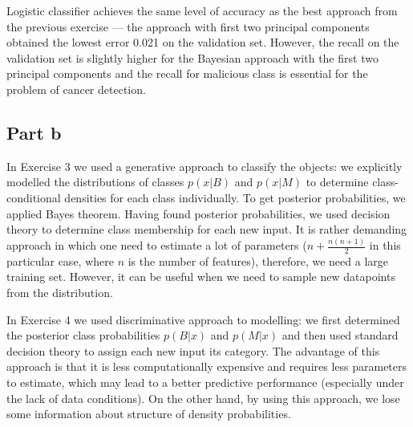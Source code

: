 \documentclass[11pt,a4paper]{article}
\begin{document}
Logistic classifier achieves the same level of accuracy as the best approach from the previous exercise --- the approach with first two principal components obtained the lowest error 0.021 on the validation set. However, the recall on the validation set is slightly higher for the Bayesian approach with the first two principal components and the recall for malicious class is essential for the problem of cancer detection.

\subsection*{Part b}
In Exercise 3 we used a generative approach to classify the objects: we explicitly modelled the distributions of classes $p(x| B)$ and $p(x | M)$ to determine class-conditional densities for each class individually. To get posterior probabilities, we applied Bayes theorem. Having found posterior probabilities, we used decision theory to determine class membership for each new input. It is rather demanding approach in which one need to estimate a lot of parameters ($n + \frac{n(n + 1)}{2}$ in this particular case, where $n$ is the number of features), therefore, we need a large training set. However, it can be useful when we need to sample new datapoints from the distribution.

In Exercise 4 we used discriminative approach to modelling: we first determined the posterior class probabilities $p(B | x)$ and $p(M | x)$ and then used standard decision theory to assign each new input its category. The advantage of this approach is that it is less computationally expensive and requires less parameters to estimate, which may lead to a better predictive performance (especially under the lack of data conditions). On the other hand, by using this approach, we lose some information about structure of density probabilities.

 
\end{document}
